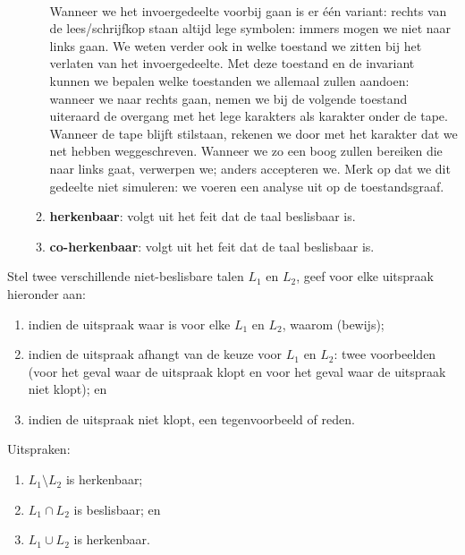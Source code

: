 \documentclass{article}
\begin{document}
\begin{question}[Berekenbaarheid]
\begin{answer}
\begin{enumerate}
\begin{enumerate}
  \paragraph{}
  Wanneer we het invoergedeelte voorbij gaan is er \'e\'en variant: rechts van de lees/schrijfkop staan altijd lege symbolen: immers mogen we niet naar links gaan. We weten verder ook in welke toestand we zitten bij het verlaten van het invoergedeelte. Met deze toestand en de invariant kunnen we bepalen welke toestanden we allemaal zullen aandoen: wanneer we naar rechts gaan, nemen we bij de volgende toestand uiteraard de overgang met het lege karakters als karakter onder de tape. Wanneer de tape blijft stilstaan, rekenen we door met het karakter dat we net hebben weggeschreven. Wanneer we zo een boog zullen bereiken die naar links gaat, verwerpen we; anders accepteren we. Merk op dat we dit gedeelte niet simuleren: we voeren een analyse uit op de toestandsgraaf.
  \item \textbf{herkenbaar}: volgt uit het feit dat de taal beslisbaar is.
  \item \textbf{co-herkenbaar}: volgt uit het feit dat de taal beslisbaar is.
 \end{enumerate}
\end{enumerate}
\end{answer}
\end{question}

\begin{question}
Stel twee verschillende niet-beslisbare talen $L_1$ en $L_2$, geef voor elke uitspraak hieronder aan:
\begin{enumerate}
 \item indien de uitspraak waar is voor elke $L_1$ en $L_2$, waarom (bewijs);
 \item indien de uitspraak afhangt van de keuze voor $L_1$ en $L_2$: twee voorbeelden (voor het geval waar de uitspraak klopt en voor het geval waar de uitspraak niet klopt); en
 \item indien de uitspraak niet klopt, een tegenvoorbeeld of reden.
\end{enumerate}
Uitspraken:
\begin{enumerate}
 \item $L_1\setminus L_2$ is herkenbaar;
 \item $L_1\cap L_2$ is beslisbaar; en
 \item $L_1\cup L_2$ is herkenbaar.
\end{enumerate}
\end{question}
\end{document}
